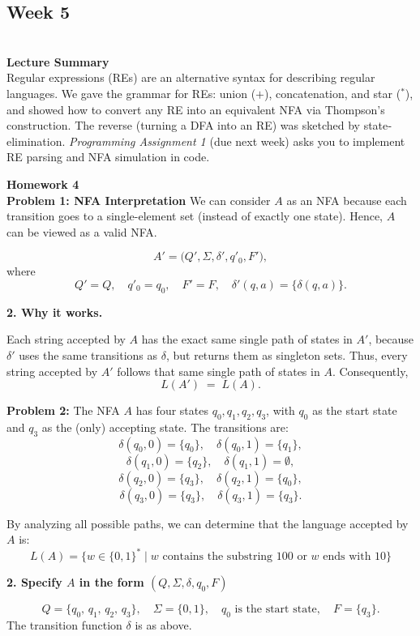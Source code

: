 \documentclass{article}
\theoremstyle{theorem}
\theoremstyle{definition}
\theoremstyle{remark}
\begin{document}

\subsection{Week 5}\\
\textbf{Lecture Summary}\\
Regular expressions (REs) are an alternative syntax for describing regular languages.  We gave the grammar for REs: union ($+$), concatenation, and star (${}^*$), and showed how to convert any RE into an equivalent NFA via Thompson’s construction.  The reverse (turning a DFA into an RE) was sketched by state‐elimination.  \emph{Programming Assignment 1} (due next week) asks you to implement RE parsing and NFA simulation in code.


\textbf{Homework 4}\\
\textbf{Problem 1: NFA Interpretation}
We can consider $A$ as an NFA because each transition goes to a 
single-element set (instead of exactly one state). Hence, $A$ 
can be viewed as a valid NFA.

\[
A' = \bigl(Q', \Sigma, \delta', q'_0, F'\bigr),
\]
where
\[
Q' = Q, 
\quad
q'_0 = q_0, 
\quad
F' = F,
\quad
\delta'(q,a) = \{\delta(q,a)\}.
\]

\textbf{2. Why it works.}

Each string accepted by $A$ has the exact same single path of states 
in $A'$, because $\delta'$ uses the same transitions as $\delta$, 
but returns them as singleton sets. 
Thus, every string accepted by $A'$ follows that same single path of 
states in $A$. Consequently,
\[
L(A') \;=\; L(A).
\]

\textbf{Problem 2:}
The NFA $A$ has four states $q_0, q_1, q_2, q_3$, with $q_0$ as the 
start state and $q_3$ as the (only) accepting state. The transitions are:
\[
\delta(q_0,0) = \{q_0\}, \quad
\delta(q_0,1) = \{q_1\},
\]
\[
\delta(q_1,0) = \{q_2\}, \quad
\delta(q_1,1) = \emptyset,
\]
\[
\delta(q_2,0) = \{q_3\}, \quad
\delta(q_2,1) = \{q_0\},
\]
\[
\delta(q_3,0) = \{q_3\}, \quad
\delta(q_3,1) = \{q_3\}.
\]

By analyzing all possible paths, we can determine that the language accepted by $A$ is:
\[
L(A) = \{w \in \{0,1\}^* \mid w \text{ contains the substring } 100 \text{ or } w \text{ ends with } 10\}
\]

\textbf{2. Specify $A$ in the form $(Q,\Sigma,\delta,q_0,F)$}

\[
Q = \{q_0,\, q_1,\, q_2,\, q_3\}, \quad
\Sigma = \{0,1\}, \quad
q_0 \text{ is the start state}, \quad
F = \{q_3\}.
\]
The transition function $\delta$ is as above.
\end{document}
